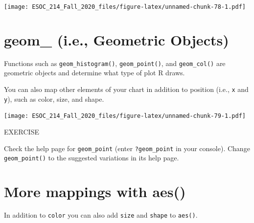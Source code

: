 \documentclass[
]{book}
\newenvironment{Shaded}{\begin{snugshade}}{\end{snugshade}}
\newcommand{\DataTypeTok}[1]{\textcolor[rgb]{0.13,0.29,0.53}{#1}}
\newcommand{\KeywordTok}[1]{\textcolor[rgb]{0.13,0.29,0.53}{\textbf{#1}}}
\newcommand{\NormalTok}[1]{#1}
\newcommand{\OperatorTok}[1]{\textcolor[rgb]{0.81,0.36,0.00}{\textbf{#1}}}
\newcommand{\StringTok}[1]{\textcolor[rgb]{0.31,0.60,0.02}{#1}}
\begin{document}
\texttt{[image: ESOC\_214\_Fall\_2020\_files/figure-latex/unnamed-chunk-78-1.pdf]}

\hypertarget{geom_-i.e.-geometric-objects}{%
\section{geom\_ (i.e., Geometric Objects)}\label{geom_-i.e.-geometric-objects}}

Functions such as \texttt{geom\_histogram()}, \texttt{geom\_point()}, and \texttt{geom\_col()} are geometric objects and determine what type of plot R draws.

You can also map other elements of your chart in addition to position (i.e., \texttt{x} and \texttt{y}), such as color, size, and shape.

\begin{Shaded}
\end{Shaded}

\texttt{[image: ESOC\_214\_Fall\_2020\_files/figure-latex/unnamed-chunk-79-1.pdf]}

EXERCISE

Check the help page for \texttt{geom\_point} (enter \texttt{?geom\_point} in your console).
Change \texttt{geom\_point()} to the suggested variations in its help page.

\hypertarget{more-mappings-with-aes}{%
\section{More mappings with aes()}\label{more-mappings-with-aes}}

In addition to \texttt{color} you can also add \texttt{size} and \texttt{shape} to \texttt{aes()}.

\begin{Shaded}
\end{Shaded}
\end{document}
